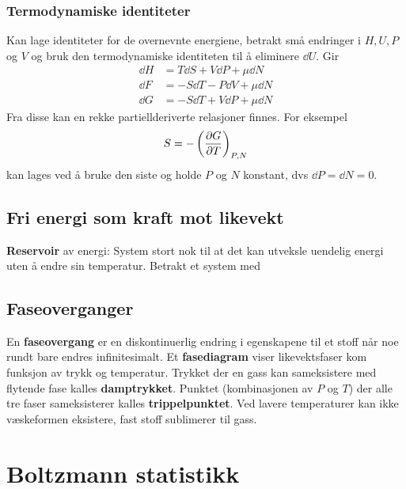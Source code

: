 \documentclass[12pt]{article}
\begin{document}
\subsubsection{Termodynamiske identiteter}
Kan lage identiteter for de overnevnte energiene, betrakt små endringer i $H, U, P$ og $V$
og bruk den termodynamiske identiteten til å eliminere $\dd U$. Gir
\begin{align*}
  \dd H &= T \dd S + V \dd P + \mu \dd N \\
  \dd F &= -S \dd T - P \dd V + \mu \dd N \\
  \dd G &= -S \dd T + V \dd P + \mu \dd N
\end{align*}
Fra disse kan en rekke partiellderiverte relasjoner finnes. For eksempel
\begin{align*}
  S = -\left( \pdv{G}{T} \right)_{P,N}
\end{align*}
kan lages ved å bruke den siste og holde $P$ og $N$ konstant, dvs $\dd P = \dd N = 0$.
\subsection{Fri energi som kraft mot likevekt}
\textbf{Reservoir} av energi: System stort nok til at det kan utveksle uendelig
energi uten å endre sin temperatur. \newline \noindent
Betrakt et system med
\subsection{Faseoverganger}
En \textbf{faseovergang} er en diskontinuerlig endring i egenskapene til et stoff
når noe rundt bare endres infinitesimalt. Et \textbf{fasediagram} viser likevektsfaser
kom funksjon av trykk og temperatur. Trykket der en gass kan sameksistere med flytende
fase kalles \textbf{damptrykket}. Punktet (kombinasjonen av $P$ og $T$) der
alle tre faser sameksisterer kalles \textbf{trippelpunktet}. Ved lavere temperaturer
kan ikke væskeformen eksistere, fast stoff sublimerer til gass.
\section{Boltzmann statistikk}
\end{document}
